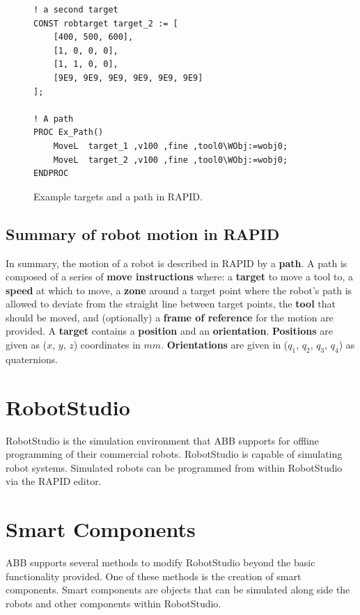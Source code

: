 \documentclass{cslthse-msc}
\begin{document}
\lstset{language=RAPID}
\begin{figure}[H]
\centering
\begin{lstlisting}
! a second target
CONST robtarget target_2 := [ 
    [400, 500, 600], 
    [1, 0, 0, 0], 
    [1, 1, 0, 0], 
    [9E9, 9E9, 9E9, 9E9, 9E9, 9E9] 
];
    
! A path
PROC Ex_Path()
    MoveL  target_1 ,v100 ,fine ,tool0\WObj:=wobj0;
    MoveL  target_2 ,v100 ,fine ,tool0\WObj:=wobj0;
ENDPROC
\end{lstlisting}
\caption{Example targets and a path in RAPID.}
\label{fig:RAPID_target_path}
\end{figure}

\subsection{Summary of robot motion in RAPID}
\label{sec:Tech_Back:Rob_Move:summary}
In summary, the motion of a robot is described in RAPID by a \textbf{path}. A path is composed of a series of \textbf{move instructions} where: a \textbf{target} to move a tool to, a \textbf{speed} at which to move, a \textbf{zone} around a target point where the robot's path is allowed to deviate from the straight line between target points, the \textbf{tool} that should be moved, and (optionally) a \textbf{frame of reference} for the motion are provided. A \textbf{target} contains a \textbf{position} and an \textbf{orientation}. \textbf{Positions} are given as ($x$, $y$, $z$) coordinates in $mm$. \textbf{Orientations} are given in ($q_1$, $q_2$, $q_3$, $q_4$) as quaternions. 


\section{RobotStudio}
\label{sec:Tech_Back:RobotStudio}
RobotStudio is the simulation environment that ABB supports for offline programming of their commercial robots. RobotStudio is capable of simulating robot systems. Simulated robots can be programmed from within RobotStudio via the RAPID editor. 

\section{Smart Components}
\label{sec:Tech_Back:Smart_Comp}
ABB supports several methods to modify RobotStudio beyond the basic functionality provided. One of these methods is the creation of smart components. Smart components are objects that can be simulated along side the robots and other components within RobotStudio. 
\end{document}
